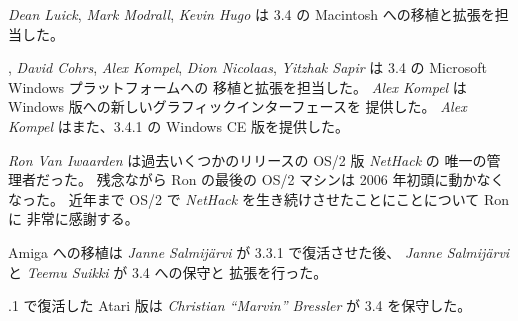 \medskip
{\it Dean Luick}, {\it Mark Modrall}, {\it Kevin Hugo} は
3.4 の Macintosh への移植と拡張を担当した。

\medskip
, {\it David Cohrs}, {\it Alex Kompel}, {\it Dion Nicolaas},
{\it Yitzhak Sapir} は 3.4 の Microsoft Windows プラットフォームへの
移植と拡張を担当した。
{\it Alex Kompel} は Windows 版への新しいグラフィックインターフェースを
提供した。
{\it Alex Kompel} はまた、3.4.1 の Windows CE 版を提供した。

\medskip
{\it Ron Van Iwaarden} は過去いくつかのリリースの OS/2 版 {\it NetHack\/} の
唯一の管理者だった。
残念ながら Ron の最後の OS/2 マシンは 2006 年初頭に動かなくなった。
近年まで OS/2 で {\it NetHack\/} を生き続けさせたことにことについて Ron に
非常に感謝する。

\medskip
\nd Amiga への移植は {\it Janne Salmij\"{a}rvi} が 3.3.1 で復活させた後、
{\it Janne Salmij\"{a}rvi} と {\it Teemu Suikki} が 3.4 への保守と
拡張を行った。

\medskip
.1 で復活した Atari 版は
{\it Christian ``Marvin'' Bressler} が 3.4 を保守した。

